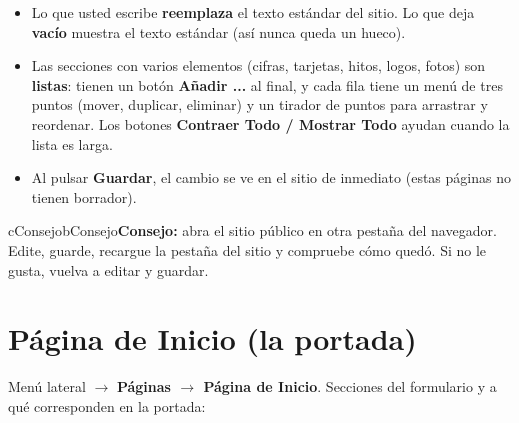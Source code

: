 \documentclass[11pt,letterpaper]{report}
\begin{document}
\begin{itemize}
  \item Lo que usted escribe \textbf{reemplaza} el texto estándar del sitio. Lo que deja \textbf{vacío} muestra el texto estándar (así nunca queda un hueco).
  \item Las secciones con varios elementos (cifras, tarjetas, hitos, logos, fotos) son \textbf{listas}: tienen un botón \textbf{Añadir ...} al final, y cada fila tiene un menú de tres puntos (mover, duplicar, eliminar) y un tirador de puntos para arrastrar y reordenar. Los botones \textbf{Contraer Todo / Mostrar Todo} ayudan cuando la lista es larga.
  \item Al pulsar \textbf{Guardar}, el cambio se ve en el sitio de inmediato (estas páginas no tienen borrador).
\end{itemize}
\begin{recuadro}{cConsejo}{bConsejo}\textbf{\color{bConsejo}Consejo:} abra el sitio público en otra pestaña del navegador. Edite, guarde, recargue la pestaña del sitio y compruebe cómo quedó. Si no le gusta, vuelva a editar y guardar.\end{recuadro}
\section{Página de Inicio (la portada)}
Menú lateral $\rightarrow$ \textbf{Páginas $\rightarrow$ Página de Inicio}. Secciones del formulario y a qué corresponden en la portada:
\end{document}
